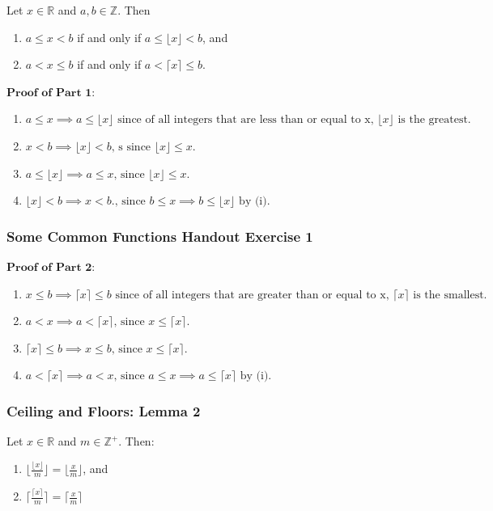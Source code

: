 \documentclass{article}
\begin{document}
Let $x \in \mathbb{R}$ and $a,b \in \mathbb{Z}$. Then 

\begin{enumerate}
    \item $a \le x < b$ if and only if $a \le \lfloor x \rfloor < b$, and 
    \item $a < x \le b$ if and only if $a < \lceil x \rceil \le b$.
\end{enumerate}

$\textbf{Proof of Part 1:}$
\begin{enumerate}[label=(\roman*)]
\item $a \le x \implies a \le \lfloor x \rfloor \text{ since of all integers that are less than or equal to x, } \lfloor x \rfloor \text{ is the greatest.}$
\item $x < b \implies \lfloor x \rfloor < b \text{, s since } \lfloor x \rfloor \le x.$
\item $a \le \lfloor x \rfloor \implies a \le x \text{, since } \lfloor x \rfloor \le x.$
\item $\lfloor x \rfloor < b \implies x < b. \text{, since } b \le x \implies b \le \lfloor x \rfloor \text{ by (i).}$
\end{enumerate}

\subsubsection{Some Common Functions Handout Exercise 1}
$\textbf{Proof of Part 2:}$
\begin{enumerate}[label=(\roman*)]
\item $x \le b \implies \lceil x \rceil \le b \text{ since of all integers that are greater than or equal to x, } \lceil x \rceil \text{ is the smallest.}$
\item $a < x \implies a < \lceil x \rceil \text{, since } x \le \lceil x \rceil.$
\item $\lceil x \rceil \le b \implies x \le b \text{, since } x \le \lceil x \rceil.$
\item $a < \lceil x \rceil \implies a < x \text{, since } a \le x \implies a \le \lceil x \rceil \text{ by (i).}$
\end{enumerate}

\subsubsection{Ceiling and Floors: Lemma 2}
Let $x \in \mathbb{R}$ and $m \in \mathbb{Z}^+$. Then:
\begin{enumerate}
    \item $\lfloor \frac{\lfloor x \rfloor}{m} \rfloor = \lfloor \frac{x}{m} \rfloor$, and 
    \item $\lceil \frac{\lceil x \rceil}{m} \rceil = \lceil\frac{x}{m} \rceil$
\end{enumerate}
\end{document}
